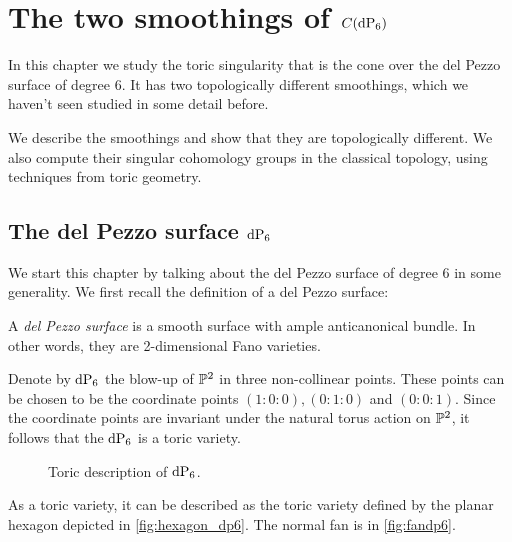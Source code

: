 \chapter{The two smoothings of \texorpdfstring{$C(\dP6)$}{C(dP6)}}
\label{chap:smoothings}

In this chapter we study the toric singularity that is the cone over the del Pezzo surface of degree $6$. It has two topologically different smoothings, which we haven't seen studied in some detail before.

We describe the smoothings and show that they are topologically different. We also compute their singular cohomology groups in the classical topology, using techniques from toric geometry.

\section{The del Pezzo surface \texorpdfstring{$\dP6$}{dP6}}
\label{sec:twosmoothings}

We start this chapter by talking about the del Pezzo surface of degree $6$ in some generality. We first recall the definition of a del Pezzo surface:

\begin{definition}
A \emph{del Pezzo surface} is a smooth surface with ample anticanonical bundle. In other words, they are 2-dimensional Fano varieties.
\end{definition}

Denote by $\dP6$ the blow-up of $\P^2$ in three non-collinear points.  These points can be chosen to be the coordinate points $(1:0:0),(0:1:0)$ and $(0:0:1)$. Since the coordinate points are invariant under the natural torus action on $\P^2$, it follows that the $\dP6$ is a toric variety.

\begin{figure}[b]
\centering 
\hspace*{\fill}
\hspace*{\fill}
\hspace*{\fill}
\caption{Toric description of $\dP6$.}
\end{figure}

As a toric variety, it can be described as the toric variety defined by the planar hexagon depicted in \cref{fig:hexagon_dp6}. The normal fan is in \cref{fig:fandp6}.


